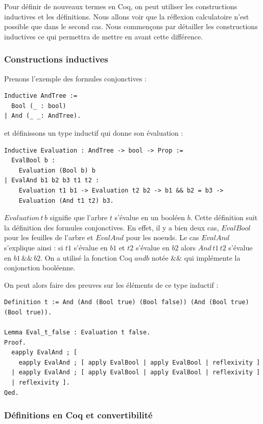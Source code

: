 \documentclass[11pt]{article}
\begin{document}
Pour définir de nouveaux termes en Coq, on peut utiliser les constructions inductives et les définitions. Nous allons voir que la réflexion calculatoire n'est possible que dans le second cas. Nous commençons par détailler les constructions inductives ce qui permettra de mettre en avant cette différence.

\subsubsection{Constructions inductives}

Prenons l'exemple des formules conjonctives : 

\begin{lstlisting}[frame=single]
Inductive AndTree :=
  Bool (_ : bool)
| And (_ _: AndTree).
\end{lstlisting}

et définissons un type inductif qui donne son évaluation : 

\begin{lstlisting}[frame=single]
Inductive Evaluation : AndTree -> bool -> Prop :=
  EvalBool b :
    Evaluation (Bool b) b
| EvalAnd b1 b2 b3 t1 t2 :
    Evaluation t1 b1 -> Evaluation t2 b2 -> b1 && b2 = b3 ->
    Evaluation (And t1 t2) b3.
\end{lstlisting}
$Evaluation \, t \, b$ signifie que l'arbre $t$ s'évalue en un booléen $b$. Cette définition suit la définition des formules conjonctives. En effet, il y a bien deux cas, $EvalBool$ pour les feuilles de l'arbre et $EvalAnd$ pour les noeuds. Le cas $EvalAnd$ s'explique ainsi : si $t1$ s'évalue en $b1$ et $t2$ s'évalue en $b2$ alors $And \, t1 \, t2$ s'évalue en $b1\,\&\&\,b2$.  On a utilisé la fonction Coq $andb$ notée $\&\&$ qui implémente la conjonction booléenne.

On peut alors faire des preuves sur les éléments de ce type inductif : 
\begin{lstlisting}[frame=single]
Definition t := And (And (Bool true) (Bool false)) (And (Bool true) (Bool true)).

Lemma Eval_t_false : Evaluation t false.
Proof.
  eapply EvalAnd ; [
    eapply EvalAnd ; [ apply EvalBool | apply EvalBool | reflexivity ]
  | eapply EvalAnd ; [ apply EvalBool | apply EvalBool | reflexivity ]
  | reflexivity ].
Qed.
\end{lstlisting}

\subsubsection{Définitions en Coq et convertibilité}
\end{document}
